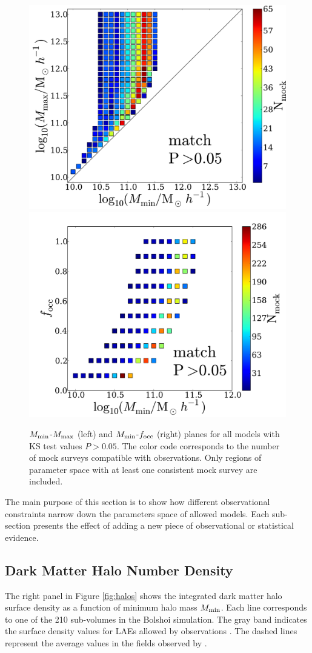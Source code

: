 \documentclass[usenatbib]{mn2e}
\begin{document}
\begin{figure}
\begin{center}
\includegraphics[width=0.46\linewidth,angle=0]{Fig2_match_P5.pdf}
\vspace{5mm}
\includegraphics[width=0.49\linewidth,angle=0]{Fig3_match_P5.pdf}
\end{center} 
\caption{$M_{\rm min}$-$M_{\rm max}$ (left) and $M_{\rm    min}$-$f_{\rm
    occ}$ (right) planes for all models with  KS test values
  $P>0.05$. The color code corresponds to the number of mock surveys
  compatible with observations. Only regions of parameter  space with
  at least one consistent mock survey are
  included. \label{fig:landscape}}      
\end{figure} 

The main purpose of this section is to show how different
observational constraints narrow down the parameters space of allowed
models. Each sub-section presents the effect of adding a new piece of 
observational or statistical evidence. 


\subsection{Dark Matter Halo Number Density}

The right panel in Figure \ref{fig:halos} shows the  integrated dark matter halo surface
density as a function of  minimum halo mass $M_{\rm min}$. Each line
corresponds to one of the 210 sub-volumes in the Bolshoi
simulation. The gray band indicates the surface density values for
LAEs allowed by observations \citep{Yamada2012}. The dashed lines
represent the average values in the fields observed by
\citep{Ouchi2008}. 
 
\end{document}
